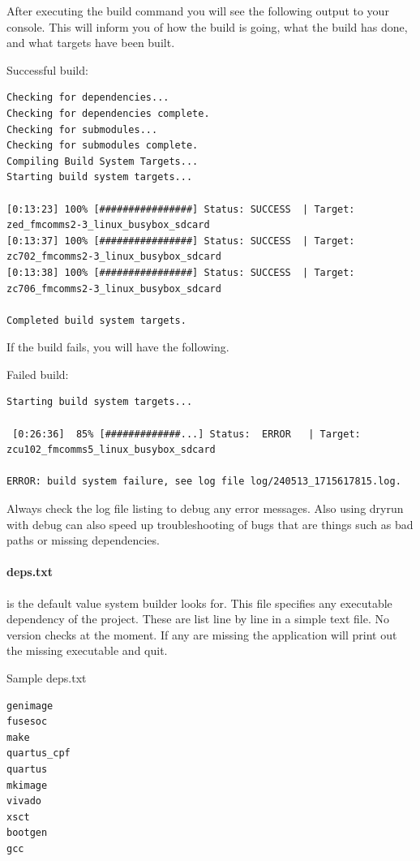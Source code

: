 \par
After executing the build command you will see the following output to your console. This will inform you of how the build is going,
what the build has done, and what targets have been built.

\par
Successful build:
\begin{lstlisting}[language={}]
Checking for dependencies...
Checking for dependencies complete.
Checking for submodules...
Checking for submodules complete.
Compiling Build System Targets...
Starting build system targets...

[0:13:23] 100% [################] Status: SUCCESS  | Target: zed_fmcomms2-3_linux_busybox_sdcard
[0:13:37] 100% [################] Status: SUCCESS  | Target: zc702_fmcomms2-3_linux_busybox_sdcard
[0:13:38] 100% [################] Status: SUCCESS  | Target: zc706_fmcomms2-3_linux_busybox_sdcard

Completed build system targets.
\end{lstlisting}
If the build fails, you will have the following.

\par
Failed build:
\begin{lstlisting}[language={}]
Starting build system targets...

 [0:26:36]  85% [#############...] Status:  ERROR   | Target: zcu102_fmcomms5_linux_busybox_sdcard

ERROR: build system failure, see log file log/240513_1715617815.log.
\end{lstlisting}
Always check the log file listing to debug any error messages. Also using \textendash dryrun with \textendash debug can also speed up troubleshooting
of bugs that are things such as bad paths or missing dependencies.

\paragraph{deps.txt} is the default value system builder looks for. This file specifies any executable dependency of the project.
These are list line by line in a simple text file. No version checks at the moment. If any are missing the application will print out
the missing executable and quit.

Sample deps.txt
\begin{lstlisting}[language={}]
genimage
fusesoc
make
quartus_cpf
quartus
mkimage
vivado
xsct
bootgen
gcc
\end{lstlisting}

